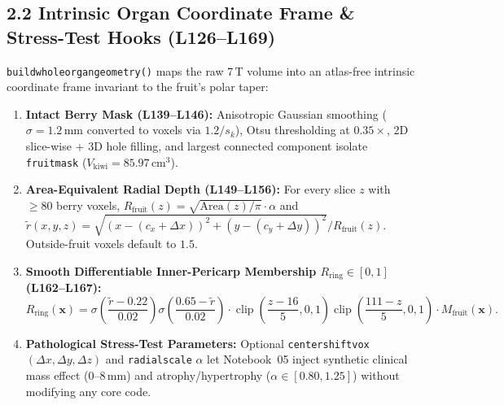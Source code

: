 \documentclass[10pt,a4paper]{article}
\renewcommand{\_}{\origunderscore\allowbreak}
\begin{document}
\subsection*{2.2 Intrinsic Organ Coordinate Frame \& Stress-Test Hooks (L126--L169)}
\begin{annotbox}
\texttt{build\_whole\_organ\_geometry()} maps the raw 7\,T volume into an atlas-free intrinsic coordinate frame invariant to the fruit's polar taper:
\begin{enumerate}
    \item \textbf{Intact Berry Mask (L139--L146):} Anisotropic Gaussian smoothing ($\sigma = 1.2\,\text{mm}$ converted to voxels via $1.2 / s_k$), Otsu thresholding at $0.35\times$, 2D slice-wise + 3D hole filling, and largest connected component isolate \texttt{fruit\_mask} ($V_{\text{kiwi}} = 85.97\,\text{cm}^3$).
    \item \textbf{Area-Equivalent Radial Depth (L149--L156):} For every slice $z$ with $\ge 80$ berry voxels, $R_{\text{fruit}}(z) = \sqrt{\text{Area}(z)/\pi} \cdot \alpha$ and $\tilde{r}(x,y,z) = \sqrt{(x - (c_x + \Delta x))^2 + (y - (c_y + \Delta y))^2} / R_{\text{fruit}}(z)$. Outside-fruit voxels default to $1.5$.
    \item \textbf{Smooth Differentiable Inner-Pericarp Membership $R_{\text{ring}} \in [0, 1]$ (L162--L167):}
    \[
        R_{\text{ring}}(\mathbf{x}) = \sigma\!\left(\frac{\tilde{r} - 0.22}{0.02}\right)\sigma\!\left(\frac{0.65 - \tilde{r}}{0.02}\right) \cdot \operatorname{clip}\!\left(\frac{z - 16}{5}, 0, 1\right)\operatorname{clip}\!\left(\frac{111 - z}{5}, 0, 1\right) \cdot M_{\text{fruit}}(\mathbf{x}).
    \]
    \item \textbf{Pathological Stress-Test Parameters:} Optional \texttt{center\_shift\_vox} $(\Delta x, \Delta y, \Delta z)$ and \texttt{radial\_scale} $\alpha$ let Notebook~05 inject synthetic clinical mass effect ($0$--$8\,\text{mm}$) and atrophy/hypertrophy ($\alpha \in [0.80, 1.25]$) without modifying any core code.
\end{enumerate}
\end{annotbox}
\end{document}
